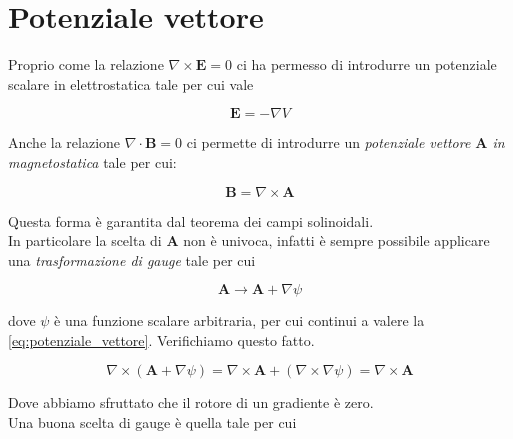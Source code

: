 \chapter{Potenziale vettore}

Proprio come la relazione $\nabla \times \mathbf{E} = 0$ ci ha permesso di introdurre un potenziale scalare in elettrostatica tale per cui vale 

\begin{equation*}
    \mathbf{E} = - \nabla V
\end{equation*}

Anche la relazione $\nabla \cdot \mathbf{B} = 0$ ci permette di introdurre un \emph{potenziale vettore $\mathbf{A}$  in magnetostatica} tale per cui:

\begin{tcolorbox}[colback=yellow!10!white, colframe=orange!70!black, boxrule=0.8pt]
\begin{equation} \label{eq:potenziale_vettore}
    \mathbf{B} = \nabla \times \mathbf{A}
\end{equation}
\end{tcolorbox}

Questa forma è garantita dal teorema dei campi solinoidali. \\

In particolare la scelta di $\mathbf{A}$ non è univoca, infatti è sempre possibile applicare una \emph{trasformazione di gauge} tale per cui

\begin{tcolorbox}[colback=yellow!10!white, colframe=orange!70!black, boxrule=0.8pt]
\begin{equation}
    \mathbf{A} \to \mathbf{A} + \nabla \psi
\end{equation}
\end{tcolorbox}

dove $\psi$ è una funzione scalare arbitraria, per cui continui a valere la \ref{eq:potenziale_vettore}. Verifichiamo questo fatto. 

\begin{equation*}
    \nabla \times (\mathbf{A} + \nabla \psi ) = \nabla \times \mathbf{A} + (\nabla \times \nabla  \psi) = \nabla \times \mathbf{A}
\end{equation*}

Dove abbiamo sfruttato che il rotore di un gradiente è zero. \\

Una buona scelta di gauge è quella tale per cui 

